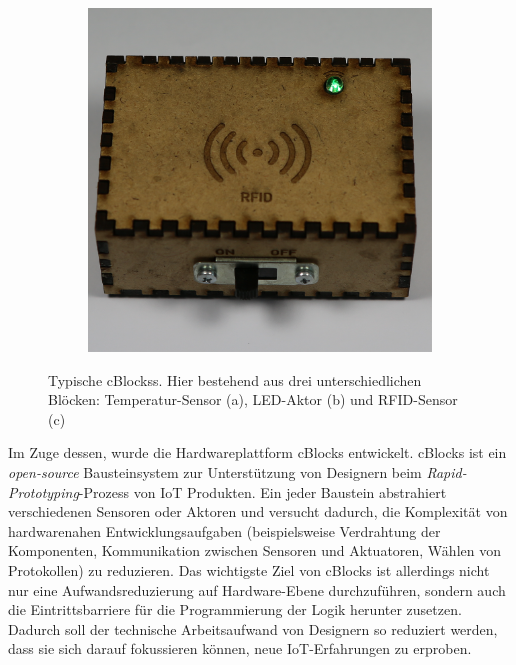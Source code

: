 \begin{figure}[h]
\begin{subfigure}[b]{0.3\textwidth}
        \caption{}
        \label{fig:tiger}
    \end{subfigure}
    \quad
    \begin{subfigure}[b]{0.3\textwidth}
        \includegraphics[width=1\linewidth]{bilder/chapter1/RFID.png}
        \caption{}
        \label{fig:mouse}
    \end{subfigure}
    \caption{Typische \acp{cBlocks}. Hier bestehend aus drei unterschiedlichen Blöcken: Temperatur-Sensor (a),  LED-Aktor (b) und RFID-Sensor (c)}
    \label{fig:cblockfoto}
\end{figure}


Im Zuge dessen, wurde die Hardwareplattform \acp{cBlock} entwickelt. \acp{cBlock} ist ein \textit{open-source} Bausteinsystem zur Unterstützung von Designern beim \textit{Rapid-Prototyping}-Prozess von \ac{IoT} Produkten. Ein jeder Baustein abstrahiert verschiedenen Sensoren oder Aktoren und versucht dadurch, die Komplexität von hardwarenahen Entwicklungsaufgaben (beispielsweise Verdrahtung der Komponenten, Kommunikation zwischen Sensoren und Aktuatoren, Wählen von Protokollen) zu reduzieren. Das wichtigste Ziel von \acp{cBlock} ist allerdings nicht nur eine Aufwandsreduzierung auf Hardware-Ebene durchzuführen, sondern auch die Eintrittsbarriere für die Programmierung der Logik herunter zusetzen. Dadurch soll der technische Arbeitsaufwand von Designern so reduziert werden, dass sie sich darauf fokussieren können, neue \ac{IoT}-Erfahrungen zu erproben.

